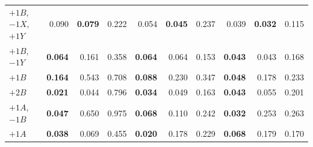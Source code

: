 \begin{table}[htbp]
\begin{tabular}{l rrr rrr rrr}
$+1B$, $-1X$, $+1Y$ & 0.090 & \textbf{0.079} & 0.222 & 0.054 & \textbf{0.045} & 0.237 & 0.039 & \textbf{0.032} & 0.115 \\
$+1B$, $-1Y$ & \textbf{0.064} & 0.161 & 0.358 & \textbf{0.064} & 0.064 & 0.153 & \textbf{0.043} & 0.043 & 0.168 \\
$+1B$ & \textbf{0.164} & 0.543 & 0.708 & \textbf{0.088} & 0.230 & 0.347 & \textbf{0.048} & 0.178 & 0.233 \\
$+2B$ & \textbf{0.021} & 0.044 & 0.796 & \textbf{0.034} & 0.049 & 0.163 & \textbf{0.043} & 0.055 & 0.201 \\
$+1A$, $-1B$ & \textbf{0.047} & 0.650 & 0.975 & \textbf{0.068} & 0.110 & 0.242 & \textbf{0.032} & 0.253 & 0.263 \\
$+1A$ & \textbf{0.038} & 0.069 & 0.455 & \textbf{0.020} & 0.178 & 0.229 & \textbf{0.068} & 0.179 & 0.170 \\
\bottomrule
\end{tabular}
\end{table}